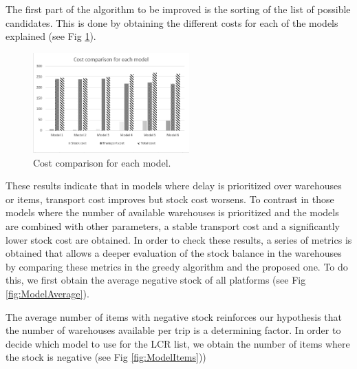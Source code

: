 \documentclass[letterpaper]{article} %
\begin{document}
The first part of the algorithm to be improved is the sorting of the list of possible candidates. This is done by obtaining the different costs for each of the models explained (see Fig \ref{fig:ModelCosts}). 

\begin{figure}[H]
    \includegraphics[width=6cm]{img/costcomparisionMODEL.png}
    \centering
    \caption{Cost comparison for each model.}
    \label{fig:ModelCosts}
\end{figure}

These results indicate that in models where delay is prioritized over warehouses or items, transport cost improves but stock cost worsens. To contrast in those models where the number of available warehouses is prioritized and the models are combined with other parameters, a stable transport cost and a significantly lower stock cost are obtained. In order to check these results, a series of metrics is obtained that allows a deeper evaluation of the stock balance in the warehouses by comparing these metrics in the greedy algorithm and the proposed one. To do this, we first obtain the average negative stock of all platforms (see Fig \ref{fig:ModelAverage}).

The average number of items with negative stock reinforces our hypothesis that the number of warehouses available per trip is a determining factor. In order to decide which model to use for the LCR list, we obtain the number of items where the stock is negative (see Fig \ref{fig:ModelItems}))
\end{document}
